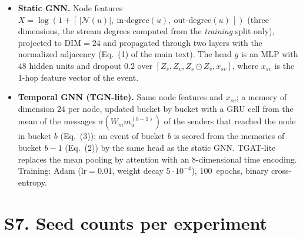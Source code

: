 \documentclass[a4paper,11pt]{article}
\begin{document}
\begin{itemize}
  transfer its causal-path idea (a precursor that explains the hop, and a rare target) to the email
  communication graph.
  \item \textbf{Static GNN.} Node features $X=\log(1+[\,|\mathcal{N}(u)|,\ \text{in-degree}(u),\ \text{out-degree}(u)\,])$
  (three dimensions, the stream degrees computed from the \emph{training} split only), projected to $\mathrm{DIM}{=}24$ and propagated through two
  layers with the normalized adjacency (Eq.~(1) of the main text). The head $g$ is an MLP with $48$ hidden
  units and dropout $0.2$ over $[Z_s, Z_v, Z_s\!\odot\!Z_v, x_{sv}]$, where $x_{sv}$ is the 1-hop feature vector
  of the event.
  \item \textbf{Temporal GNN (TGN-lite).} Same node features and $x_{sv}$; a memory of dimension $24$ per node,
  updated bucket by bucket with a GRU cell from the mean of the messages $\sigma(W_m m_u^{(b-1)})$ of the
  senders that reached the node in bucket $b$ (Eq.~(3)); an event of bucket $b$ is scored from the memories of
  bucket $b-1$ (Eq.~(2)) by the same head as the static GNN. TGAT-lite replaces the mean pooling by attention
  with an $8$-dimensional time encoding. Training: Adam ($\mathrm{lr}{=}0.01$, weight decay $5\cdot10^{-4}$),
  $100$~epochs, binary cross-entropy.
\end{itemize}

\clearpage
\section*{S7. Seed counts per experiment}
\end{document}
